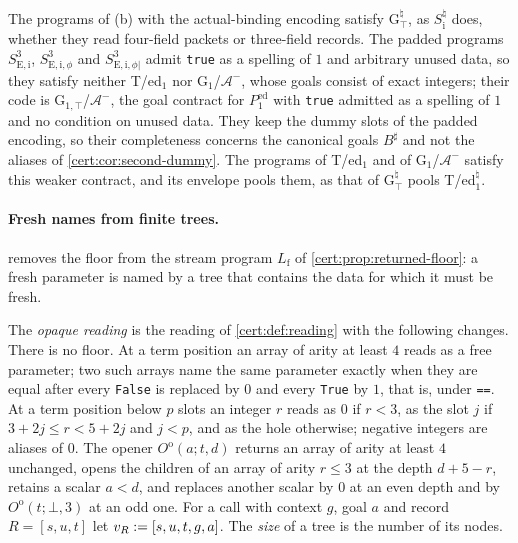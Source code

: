 \begin{remark}\label{cert:rem:local-contracts}
The programs of (b) with the actual-binding encoding satisfy G$^{\natural}_{\top}$, as
$S^{\natural}_{\mathrm i}$ does, whether they read four-field packets or three-field records.
The padded programs $S^{3}_{\mathrm{E,i}}$, $S^{3}_{\mathrm{E,i},\phi}$ and
$S^{3}_{\mathrm{E,i},\phi|}$ admit \texttt{true} as a spelling of $1$ and arbitrary unused data, so
they satisfy neither T/ed$_1$ nor G$_1$/$\mathcal A^{-}$, whose goals consist of exact integers;
their code is G$_{1,\top}$/$\mathcal A^{-}$, the goal contract for $P^{\mathrm{ed}}_{1}$ with
\texttt{true} admitted as a spelling of $1$ and no condition on unused data. They keep the dummy
slots of the padded encoding, so their completeness concerns the canonical goals $B^{\sharp}$ and
not the aliases of \cref{cert:cor:second-dummy}. The programs of T/ed$_1$ and of
G$_1$/$\mathcal A^{-}$ satisfy this weaker contract, and its envelope pools them, as that of
G$^{\natural}_{\top}$ pools T/ed$_1^{\natural}$.
\end{remark}

\paragraph{Fresh names from finite trees.}  removes the floor from
the stream program $L_{\mathrm f}$ of \cref{cert:prop:returned-floor}: a fresh parameter is
named by a tree that contains the data for which it must be fresh.

\begin{definition}\label{cert:def:opaque}
The \emph{opaque reading} is the reading of \cref{cert:def:reading} with the following changes.
There is no floor. At a term position an array of arity at least $4$ reads as a free parameter;
two such arrays name the same parameter exactly when they are equal after every \texttt{False}
is replaced by $0$ and every \texttt{True} by $1$, that is, under \texttt{==}. At a term position
below $p$ slots an integer $r$ reads as $0$ if $r<3$, as the slot $j$ if $3+2j\le r<5+2j$ and
$j<p$, and as the hole otherwise; negative integers are aliases of $0$. The opener
$O^{\mathrm o}(a;t,d)$ returns an array of arity at least $4$ unchanged, opens the children of an
array of arity $r\le 3$ at the depth $d+5-r$, retains a scalar $a<d$, and replaces another
scalar by $0$ at an even depth and by $O^{\mathrm o}(t;\bot,3)$ at an odd one. For a call with
context $g$, goal $a$ and record $R=[s,u,t]$ let $v_R\mathrel{:=}[s,u,t,g,a]$. The \emph{size} of a
tree is the number of its nodes.
\end{definition}

